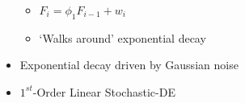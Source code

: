\documentclass[hyperref={pdfpagelabels=false}]{beamer}
\begin{document}
\begin{frame}
\begin{columns}
\begin{column}{0.5\textwidth}
\begin{itemize}
\begin{itemize}
        \item $F_{i} = \phi_{1} F_{i-1} + w_{i}$
        \item `Walks around' exponential decay%
      \end{itemize}
    \item Exponential decay driven by Gaussian noise
    \item $1^{st}$-Order Linear Stochastic-DE
    \end{itemize}
    \end{column}
  \end{columns}
\end{frame}
\end{document}

